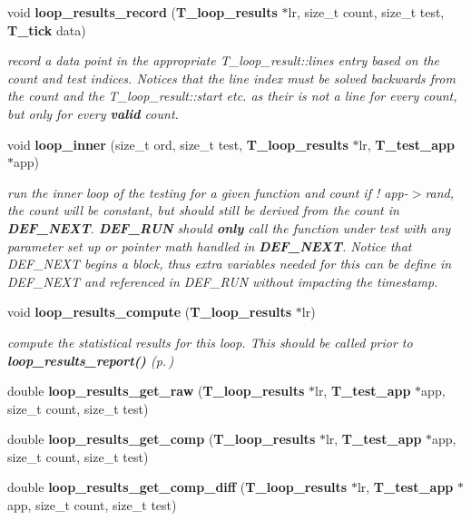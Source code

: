 \begin{CompactItemize}
void {\bf loop\_\-results\_\-record} ({\bf T\_\-loop\_\-results} $\ast$lr, size\_\-t count, size\_\-t test, {\bf T\_\-tick} data)
\begin{CompactList}\small\item\em record a data point in the appropriate T\_\-loop\_\-result::lines entry based on the count and test indices. Notices that the line index must be solved backwards from the count and the T\_\-loop\_\-result::start etc. as their is not a line for every count, but only for every {\bf valid} count.\item\end{CompactList}\item 
void {\bf loop\_\-inner} (size\_\-t ord, size\_\-t test, {\bf T\_\-loop\_\-results} $\ast$lr, {\bf T\_\-test\_\-app} $\ast$app)
\begin{CompactList}\small\item\em run the inner loop of the testing for a given function and count if ! app-$>$rand, the count will be constant, but should still be derived from the count in {\bf DEF\_\-NEXT}. {\bf DEF\_\-RUN} should {\bf only} call the function under test with any parameter set up or pointer math handled in {\bf DEF\_\-NEXT}. Notice that DEF\_\-NEXT begins a block, thus extra variables needed for this can be define in DEF\_\-NEXT and referenced in DEF\_\-RUN without impacting the timestamp.\item\end{CompactList}\item 
void {\bf loop\_\-results\_\-compute} ({\bf T\_\-loop\_\-results} $\ast$lr)
\begin{CompactList}\small\item\em compute the statistical results for this loop. This should be called prior to {\bf loop\_\-results\_\-report()} {\rm (p.\,\pageref{group__loop__test_a19})}\item\end{CompactList}\item 
double {\bf loop\_\-results\_\-get\_\-raw} ({\bf T\_\-loop\_\-results} $\ast$lr, {\bf T\_\-test\_\-app} $\ast$app, size\_\-t count, size\_\-t test)
\item 
double {\bf loop\_\-results\_\-get\_\-comp} ({\bf T\_\-loop\_\-results} $\ast$lr, {\bf T\_\-test\_\-app} $\ast$app, size\_\-t count, size\_\-t test)
\item 
double {\bf loop\_\-results\_\-get\_\-comp\_\-diff} ({\bf T\_\-loop\_\-results} $\ast$lr, {\bf T\_\-test\_\-app} $\ast$app, size\_\-t count, size\_\-t test)
\item 

\end{CompactItemize}
